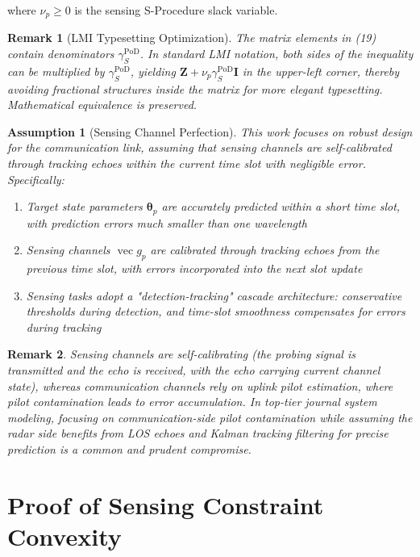 \documentclass[12pt,a4paper]{article}
\DeclareMathOperator{\vect}{vec}
\newcommand{\mat}[1]{\mathbf{#1}}
\newtheorem{remark}{Remark}
\newtheorem{assumption}{Assumption}
\begin{document}
where $\nu_p \geq 0$ is the sensing S-Procedure slack variable.

\begin{remark}[LMI Typesetting Optimization]
The matrix elements in (19) contain denominators $\gamma_S^{\text{PoD}}$. In standard LMI notation, both sides of the inequality can be multiplied by $\gamma_S^{\text{PoD}}$, yielding $\mat{Z} + \nu_p \gamma_S^{\text{PoD}} \mat{I}$ in the upper-left corner, thereby avoiding fractional structures inside the matrix for more elegant typesetting. Mathematical equivalence is preserved.
\end{remark}

\begin{assumption}[Sensing Channel Perfection]\label{ass:2}
This work focuses on robust design for the communication link, assuming that sensing channels are self-calibrated through tracking echoes within the current time slot with negligible error. Specifically:
\begin{enumerate}
    \item Target state parameters $\boldsymbol{\theta}_p$ are accurately predicted within a short time slot, with prediction errors much smaller than one wavelength
    \item Sensing channels $\vect{g}_p$ are calibrated through tracking echoes from the previous time slot, with errors incorporated into the next slot update
    \item Sensing tasks adopt a "detection-tracking" cascade architecture: conservative thresholds during detection, and time-slot smoothness compensates for errors during tracking
\end{enumerate}
\end{assumption}

\begin{remark}
Sensing channels are self-calibrating (the probing signal is transmitted and the echo is received, with the echo carrying current channel state), whereas communication channels rely on uplink pilot estimation, where pilot contamination leads to error accumulation. In top-tier journal system modeling, focusing on communication-side pilot contamination while assuming the radar side benefits from LOS echoes and Kalman tracking filtering for precise prediction is a common and prudent compromise.
\end{remark}

\section{Proof of Sensing Constraint Convexity}
\end{document}
